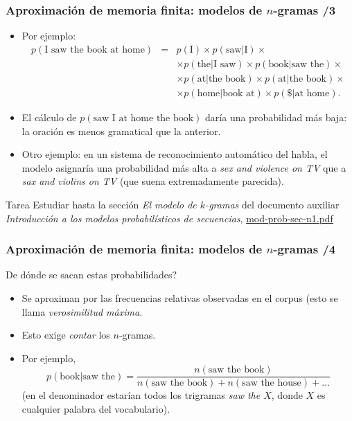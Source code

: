 \begin{frame}
  \frametitle{Aproximación de memoria finita: modelos de \(n\)-gramas /3} 
\begin{itemize}
\item Por ejemplo:
\[
\begin{array}{rcl}
 p(\mbox{I saw the book at home})  &=& p(\mbox{I})\times p(\mbox{saw}|\mbox{I}) \times \\
 && \times p(\mbox{the}|\mbox{I saw}) \times  p(\mbox{book}|\mbox{saw the}) \times 
\\
 && \times p(\mbox{at}|\mbox{the book}) \times p(\mbox{at}|\mbox{the book}) \times \\
 && \times  p(\mbox{home}|\mbox{book at}) \times p(\$|\mbox{at home}).
\end{array}
\]
\item El cálculo de \(p(\mbox{saw I at home the book})\) daría una probabilidad más baja: la  oración es menos gramatical que la anterior.
\item Otro ejemplo: en un sistema de reconocimiento automático del habla, el modelo asignaría una probabilidad más alta a \emph{sex and violence on TV} que a \emph{sax and violins on TV} (que suena extremadamente parecida).


\end{itemize}
  \begin{block}{Tarea}
    Estudiar hasta la sección \emph{El modelo de \(k\)-gramas}
    del documento auxiliar \emph{Introducción a los modelos
      probabilísticos de secuencias}, \url{mod-prob-sec-n1.pdf}
  \end{block}
\end{frame}

\begin{frame}
  \frametitle{Aproximación de memoria finita: modelos de \(n\)-gramas /4} 
De dónde se sacan estas probabilidades?
\begin{itemize}
\item Se aproximan por las frecuencias relativas observadas en el corpus (esto se llama \emph{verosimilitud máxima}.
\item Esto exige \emph{contar} los \(n\)-gramas.
\item Por ejemplo, 
\[
p(\mbox{book}|\mbox{saw the})=\frac{n(\mbox{saw the book})}{n(\mbox{saw the book}) +n(\mbox{saw the house}) + \ldots }
\]
(en el denominador estarían todos los trigramas \emph{saw the \(X\)}, donde \(X\) es cualquier palabra del vocabulario).

\end{itemize}
\end{frame}



